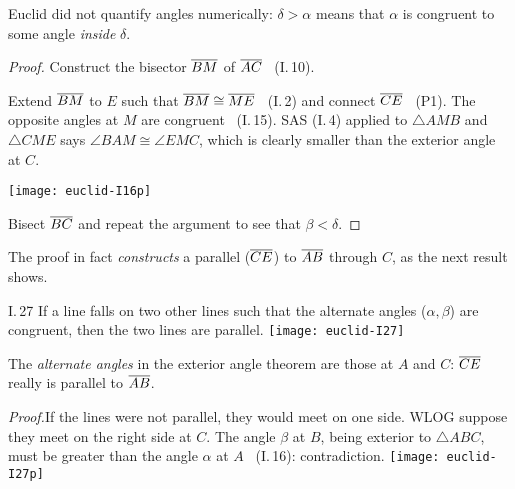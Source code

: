 Euclid did not quantify angles numerically: $\delta>\alpha$ means that $\alpha$ is congruent to some angle \emph{inside} $\delta$.

\begin{proof}
	Construct the bisector $\overline{BM}$ of $\overline{AC}$ \ (I.\,10).\par
	\begin{minipage}[t]{0.64\linewidth}\vspace{-5pt}
		Extend $\overline{BM}$ to $E$ such that $\overline{BM}\cong\overline{ME}$ \  (I.\,2) and connect $\overline{CE}$ \  (P1).\smallbreak
		The opposite angles at $M$ are congruent \ (I.\,15).\smallbreak
		SAS (I.\,4) applied to $\triangle AMB$ and $\triangle CME$ says $\angle BAM\cong\angle EMC$, which is clearly smaller than the exterior angle at $C$.
	\end{minipage}
	\hfill
	\begin{minipage}[t]{0.35\linewidth}\vspace{-20pt}
		\flushright\texttt{[image: euclid-I16p]}
	\end{minipage}
	\smallbreak
	Bisect $\overline{BC}$ and repeat the argument to see that $\beta<\delta$.
\end{proof}

The proof in fact \emph{constructs} a parallel ($\overline{CE}$) to $\overline{AB}$ through $C$, as the next result shows.

\begin{thm}[lower separated=false, sidebyside, sidebyside align=top seam, sidebyside gap=0pt, righthand width=0.32\linewidth]{I.\,27}{}
	If a line falls on two other lines such that the alternate angles ($\alpha,\beta$) are congruent, then the two lines are parallel.
	\tcblower
	\flushright\texttt{[image: euclid-I27]}
\end{thm}

The \emph{alternate angles} in the exterior angle theorem are those at $A$ and $C$: $\overline{CE}$ really is parallel to $\overline{AB}$.

\begin{tcolorbox}[proofstyle,lower separated=false, sidebyside, sidebyside align=top seam, sidebyside gap=0pt, righthand width=0.37\linewidth]
	\emph{Proof.}\lstsp If the lines were not parallel, they would meet on one side. WLOG suppose they meet on the right side at $C$.\smallbreak
	The angle $\beta$ at $B$, being exterior to $\triangle ABC$, must be greater than the angle $\alpha$ at $A$ \ (I.\,16): contradiction.
	\tcblower
	\flushright
	\texttt{[image: euclid-I27p]}\\[-12pt]\hfill\qedsymbol
\end{tcolorbox}

